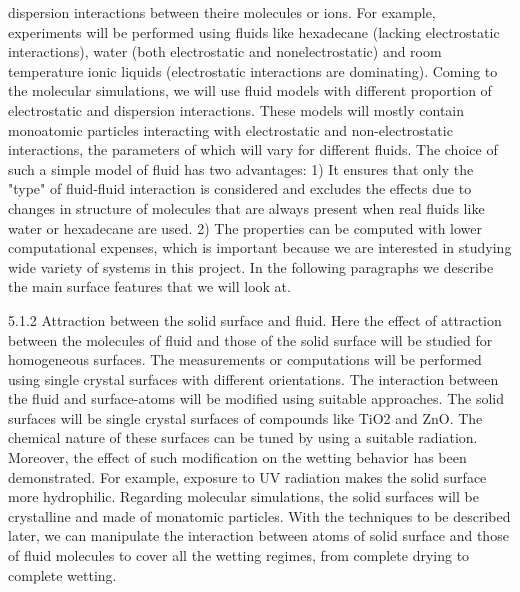 dispersion interactions between theire molecules or ions. For example, experiments will be performed using fluids like hexadecane (lacking electrostatic interactions), water (both electrostatic and nonelectrostatic) and room temperature ionic liquids (electrostatic interactions are dominating). Coming to the molecular simulations, we will use fluid models with different proportion of electrostatic and dispersion interactions. These models will mostly contain monoatomic particles interacting with electrostatic and non-electrostatic interactions, the parameters of which will vary for different fluids. The choice of such a simple model of fluid has two advantages: 1) It ensures that only the "type" of fluid-fluid interaction is considered and excludes the effects due to changes in structure of molecules that are always present when real fluids like water or hexadecane are used. 2) The properties can be computed with lower computational expenses, which is important because we are interested in studying wide variety of systems in this project.  In the following paragraphs we describe the main surface features that we will look at.
\par 5.1.2 Attraction between the solid surface and fluid. Here the effect of attraction between the molecules of fluid and those of the solid surface will be studied for homogeneous surfaces. The measurements or computations will be performed using single crystal surfaces with different orientations. The interaction between the fluid and surface-atoms will be modified using suitable approaches.  The solid surfaces will be single crystal surfaces of compounds like TiO2 and ZnO. The chemical nature of these surfaces can be tuned by using a suitable radiation. Moreover, the effect of such modification on the  wetting behavior has been demonstrated. For example, exposure to UV radiation makes the solid surface more hydrophilic. Regarding molecular simulations, the solid surfaces will be crystalline and made of monatomic particles. With the techniques to be described later, we can manipulate the interaction between atoms of solid surface and those of fluid molecules to cover all the wetting regimes, from complete drying to complete wetting.
